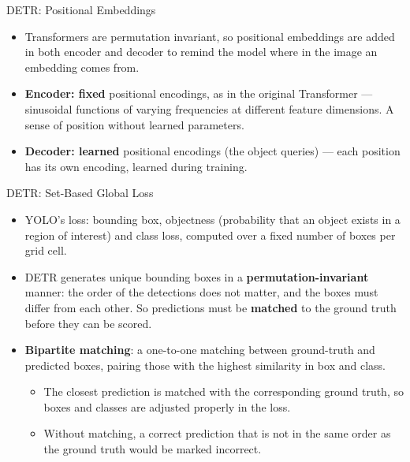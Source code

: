 \begin{frame}{DETR: Positional Embeddings}
\begin{itemize}
  \item Transformers are permutation invariant, so positional embeddings are added in both encoder and decoder to remind the model where in the image an embedding comes from.
  \item \textbf{Encoder: fixed} positional encodings, as in the original Transformer --- sinusoidal functions of varying frequencies at different feature dimensions. A sense of position without learned parameters.
  \item \textbf{Decoder: learned} positional encodings (the object queries) --- each position has its own encoding, learned during training.
\end{itemize}
\end{frame}

\begin{frame}{DETR: Set-Based Global Loss}
\footnotesize%

\begin{itemize}
  \item YOLO's loss: bounding box, objectness (probability that an object exists in a region of interest) and class loss, computed over a fixed number of boxes per grid cell.
  \item DETR generates unique bounding boxes in a \textbf{permutation-invariant} manner: the order of the detections does not matter, and the boxes must differ from each other. So predictions must be \textbf{matched} to the ground truth before they can be scored.
  \item \textbf{Bipartite matching}: a one-to-one matching between ground-truth and predicted boxes, pairing those with the highest similarity in box and class.
  \begin{itemize}
    \item The closest prediction is matched with the corresponding ground truth, so boxes and classes are adjusted properly in the loss.
    \item Without matching, a correct prediction that is not in the same order as the ground truth would be marked incorrect.
  \end{itemize}
\end{itemize}
\end{frame}

